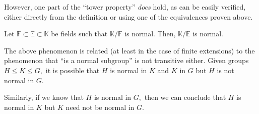 However, one part of the ``tower property'' \emph{does} hold, as can be easily verified, either directly from the definition or using one of the equivalences proven above.

\begin{prop} \label{prop:decompnormal}
    Let $\mathbb{F} \subset \mathbb{E} \subset \mathbb{K}$ be fields such that $\mathbb{K}/\mathbb{F}$ is normal. Then, $\mathbb{K}/\mathbb{E}$ is normal.
\end{prop}

\begin{rem}
    The above phenomenon is related (at least in the case of finite extensions) to the phenomenon that ``is a normal subgroup'' is not transitive either. Given groups $H \le K \le G,$ it is possible that $H$ is normal in $K$ and $K$ in $G$ but $H$ is not normal in $G.$ 

    Similarly, if we know that $H$ is normal in $G,$ then we can conclude that $H$ is normal in $K$ but $K$ need not be normal in $G.$
\end{rem}
